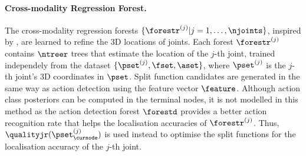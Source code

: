 %
%
%



\paragraph{Cross-modality Regression Forest.}
\label{sec:jrflearn}
The cross-modality regression forests $\{\forestr^{(j)}|{j} = 1,\dots,\njoints\}$, inspired by \cite{Criminisi2011}, are learned to refine the 3D locations of joints. Each forest $\forestr^{(j)}$ contains $\ntreer$ trees that estimate the location of the $j$-th joint, trained independely from the dataset $\{ \pset^{(j)}, \fset, \aset\}$, where $\pset^{(j)}$ is the $j$-th joint's 3D coordinates in $\pset$. 
Split function candidates are generated in the same way as action detection using the feature vector $\feature$. 
Although action class posteriors can be computed in the terminal nodes, it is not modelled in this method as the action detection forest $\forestd$ provides a better action recognition rate that helps the localisation accuracies of $\forestr^{(j)}$. Thus, $\qualityjr(\pset^{(j)}_{\curnode})$ is used instead to optimise the split functions for the localisation accuracy of the $j$-th joint. 

